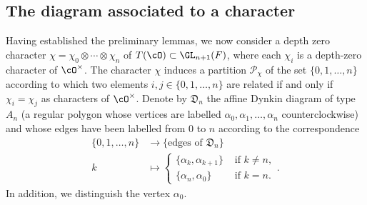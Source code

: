     \subsection{The diagram associated to a character}
    Having established the preliminary lemmas, we now consider a depth zero character $\chi=\chi_0\otimes\cdots\otimes\chi_n$ of $T(\cO)\subset\GL_{n+1}(F)$, where each $\chi_i$ is a depth-zero character of $\cO^\times$. The character $\chi$ induces a partition $\mathcal{P}_\chi$ of the set $\{0,1,\ldots,n\}$ according to which two elements $i,j\in\{0,1,\ldots,n\}$ are related if and only if $\chi_i=\chi_j$ as characters of $\cO^\times$. Denote by $\mathfrak{D}_{n}$ the affine Dynkin diagram of type $A_n$ (a regular polygon whose vertices are labelled $\alpha_0,\alpha_1,\ldots,\alpha_n$ counterclockwise) and whose edges have been labelled from $0$ to $n$ according to the correspondence 
    \begin{align*}
        \{0,1,\ldots,n\}&\longrightarrow\{\text{edges of }\mathfrak{D}_n\}\\
        k&\longmapsto
        \begin{cases}
            \{\alpha_k,\alpha_{k+1}\} &\text{ if }k\neq n,\\
            \{\alpha_n,\alpha_0\} &\text{ if }k=n.
        \end{cases}.
    \end{align*}
    In addition, we distinguish the vertex $\alpha_0$.

